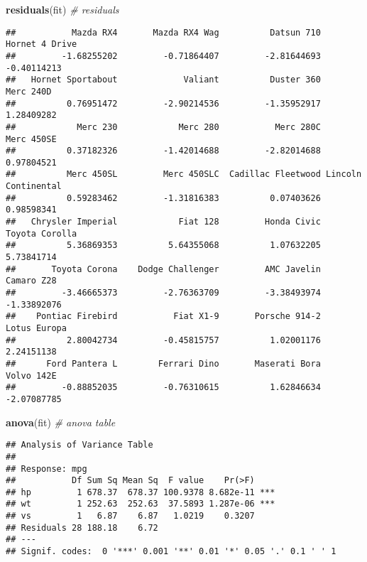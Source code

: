 \documentclass[]{article}
\newenvironment{Shaded}{\begin{snugshade}}{\end{snugshade}}
\newcommand{\CommentTok}[1]{\textcolor[rgb]{0.56,0.35,0.01}{\textit{#1}}}
\newcommand{\KeywordTok}[1]{\textcolor[rgb]{0.13,0.29,0.53}{\textbf{#1}}}
\newcommand{\NormalTok}[1]{#1}
\begin{document}
\begin{Shaded}
\begin{Highlighting}[]
\KeywordTok{residuals}\NormalTok{(fit) }\CommentTok{# residuals}
\end{Highlighting}
\end{Shaded}

\begin{verbatim}
##           Mazda RX4       Mazda RX4 Wag          Datsun 710      Hornet 4 Drive 
##         -1.68255202         -0.71864407         -2.81644693         -0.40114213 
##   Hornet Sportabout             Valiant          Duster 360           Merc 240D 
##          0.76951472         -2.90214536         -1.35952917          1.28409282 
##            Merc 230            Merc 280           Merc 280C          Merc 450SE 
##          0.37182326         -1.42014688         -2.82014688          0.97804521 
##          Merc 450SL         Merc 450SLC  Cadillac Fleetwood Lincoln Continental 
##          0.59283462         -1.31816383          0.07403626          0.98598341 
##   Chrysler Imperial            Fiat 128         Honda Civic      Toyota Corolla 
##          5.36869353          5.64355068          1.07632205          5.73841714 
##       Toyota Corona    Dodge Challenger         AMC Javelin          Camaro Z28 
##         -3.46665373         -2.76363709         -3.38493974         -1.33892076 
##    Pontiac Firebird           Fiat X1-9       Porsche 914-2        Lotus Europa 
##          2.80042734         -0.45815757          1.02001176          2.24151138 
##      Ford Pantera L        Ferrari Dino       Maserati Bora          Volvo 142E 
##         -0.88852035         -0.76310615          1.62846634         -2.07087785
\end{verbatim}

\begin{Shaded}
\begin{Highlighting}[]
\KeywordTok{anova}\NormalTok{(fit) }\CommentTok{# anova table }
\end{Highlighting}
\end{Shaded}

\begin{verbatim}
## Analysis of Variance Table
## 
## Response: mpg
##           Df Sum Sq Mean Sq  F value    Pr(>F)    
## hp         1 678.37  678.37 100.9378 8.682e-11 ***
## wt         1 252.63  252.63  37.5893 1.287e-06 ***
## vs         1   6.87    6.87   1.0219    0.3207    
## Residuals 28 188.18    6.72                       
## ---
## Signif. codes:  0 '***' 0.001 '**' 0.01 '*' 0.05 '.' 0.1 ' ' 1
\end{verbatim}
\end{document}
